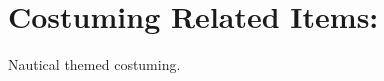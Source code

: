 \documentclass[blue]{GL2020}
\begin{document}
\section{Costuming Related Items:}
Nautical themed costuming.

\end{document}
